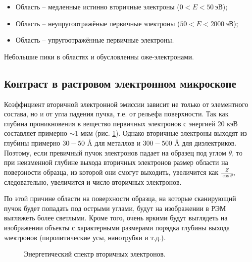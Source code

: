 \documentclass[a4paper,12pt]{article}	%
\begin{document}
    \begin{itemize}
        \item Область \MakeUppercase{} -- медленные истинно вторичные электроны ($0<E<50\ \text{эВ}$);
        \item Область \MakeUppercase{} -- неупругоотражёные первичные электроны ($50<E<2000\ \text{эВ}$);
        \item Область \MakeUppercase{} -- упругоотражённые первичные электроны.
    \end{itemize}

    Небольшие пики в областях \MakeUppercase{} и \MakeUppercase{} обусловленны оже-электронами.
    
    \subsection{Контраст в растровом электронном микроскопе}
    
\noindent Коэффициент вторичной электронной эмиссии зависит не только от элементного состава, но и от угла падения пучка, т.е. от рельефа поверхности. Так как глубина проникновения в вещество первичных электронов с энергией 20 кэВ составляет примерно $\sim$1 мкм (рис. \ref{ВЭ угол}). Однако вторичные электроны выходят из глубины примерно $30-50$ {\AA}  для металлов и $300-500$ {\AA} для диэлектриков. Поэтому, если превичный пучок электронов падает на образец под углом $\theta$, то при неизменной глубине выхода вторичных электронов размер области на поверзности образца, из которой они смогут выходить, увеличится как $\frac{Z}{\cos \theta}$, следовательно, увеличится и число вторичных электронов.

\medskip

\noindent По этой причине области на поверхности образца, на которые сканирующий пучок будет попадать под острыми углами, будут на изображении в РЭМ выгляжеть более светлыми. Кроме того, очень яркими будут выглядеть на изображении объекты с характерными размерами порядка глубины выхода электронов (пиролитические усы, нанотрубки и т.д.).

    \begin{figure}
    	\caption{Энергетический спектр вторичных электронов.}
    	\label{ВЭ угол}
    \end{figure}
    
\end{document}
